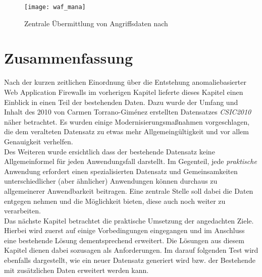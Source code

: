 \begin{figure}[ht]
  \begin{center}
    \texttt{[image: waf\_mana]}
    \caption{Zentrale Übermittlung von Angriffsdaten nach~\cite{Manaseer2018}}
    \label{fig.wafmana}
  \end{center}
\end{figure}



\section{Zusammenfassung}

Nach der kurzen zeitlichen Einordnung über die Entstehung anomaliebasierter Web Application Firewalls im vorherigen Kapitel lieferte dieses Kapitel einen Einblick in einen Teil der bestehenden Daten. Dazu wurde der Umfang und Inhalt des 2010 von Carmen Torrano-Giménez erstellten Datensatzes \emph{CSIC2010} näher betrachtet. Es wurden einige Modernisierungsmaßnahmen vorgeschlagen, die dem veralteten Datensatz zu etwas mehr Allgemeingültigkeit und vor allem Genauigkeit verhelfen.\\ Des Weiteren wurde ersichtlich dass der bestehende Datensatz keine Allgemeinformel für jeden Anwendungsfall darstellt. Im Gegenteil, jede \emph{praktische} Anwendung erfordert einen spezialisierten Datensatz und Gemeinsamkeiten unterschiedlicher (aber ähnlicher) Anwendungen können durchaus zu allgemeinerer Anwendbarkeit beitragen. Eine zentrale Stelle soll dabei die Daten entgegen nehmen und die Möglichkeit bieten, diese auch noch weiter zu verarbeiten. \\

Das nächste Kapitel betrachtet die praktische Umsetzung der angedachten Ziele. Hierbei wird zuerst auf einige Vorbedingungen eingegangen und im Anschluss eine bestehende Lösung dementsprechend erweitert. Die Lösungen aus diesem Kapitel dienen dabei sozusagen als Anforderungen. Im darauf folgenden Test wird ebenfalls dargestellt, wie ein neuer Datensatz generiert wird bzw. der Bestehende mit zusätzlichen Daten erweitert werden kann.
